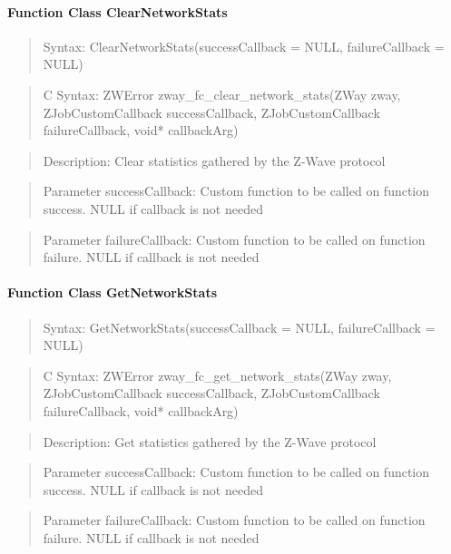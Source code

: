 \paragraph{Function Class ClearNetworkStats}
\begin{quote}Syntax: ClearNetworkStats(successCallback = NULL, failureCallback = NULL)\end{quote}
\begin{quote}C Syntax: ZWError zway\_fc\_clear\_network\_stats(ZWay zway, ZJobCustomCallback successCallback, ZJobCustomCallback failureCallback, void* callbackArg)\end{quote}
\begin{quote}Description: Clear statistics gathered by the Z-Wave protocol\end{quote}
\begin{quote}Parameter successCallback: Custom function to be called on function success. NULL if callback is not needed\end{quote}
\begin{quote}Parameter failureCallback: Custom function to be called on function failure. NULL if callback is not needed\end{quote}


\paragraph{Function Class GetNetworkStats}
\begin{quote}Syntax: GetNetworkStats(successCallback = NULL, failureCallback = NULL)\end{quote}
\begin{quote}C Syntax: ZWError zway\_fc\_get\_network\_stats(ZWay zway, ZJobCustomCallback successCallback, ZJobCustomCallback failureCallback, void* callbackArg)\end{quote}
\begin{quote}Description: Get statistics gathered by the Z-Wave protocol\end{quote}
\begin{quote}Parameter successCallback: Custom function to be called on function success. NULL if callback is not needed\end{quote}
\begin{quote}Parameter failureCallback: Custom function to be called on function failure. NULL if callback is not needed\end{quote}


